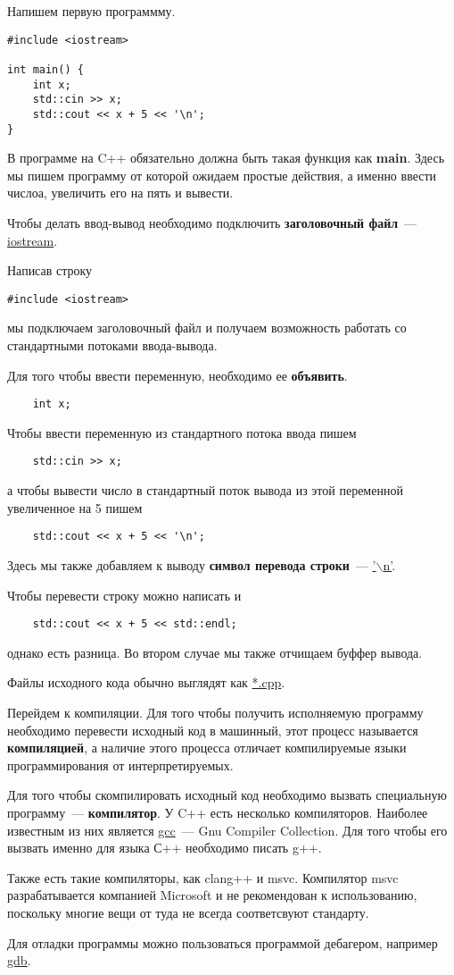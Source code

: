 \documentclass{article}
\begin{document}
Напишем первую программму.

\begin{verbatim}
#include <iostream>

int main() {
    int x;
    std::cin >> x;
    std::cout << x + 5 << '\n';
}
\end{verbatim}


В программе на C++ обязательно должна быть такая функция как \textbf{main}.
Здесь мы пишем программу от которой ожидаем простые действия, а именно ввести числоа, увеличить его на пять и вывести.

Чтобы делать ввод-вывод необходимо подключить \textbf{заголовочный файл}~--- \underline{iostream}.

Написав строку 
\begin{verbatim}
#include <iostream>
\end{verbatim}
мы подключаем заголовочный файл и получаем возможность работать со стандартными потоками ввода-вывода.

Для того чтобы ввести переменную, необходимо ее \textbf{объявить}. 
\begin{verbatim}
    int x;
\end{verbatim}

Чтобы ввести переменную из стандартного потока ввода пишем
\begin{verbatim}
    std::cin >> x;
\end{verbatim}

а чтобы вывести число в стандартный поток вывода из этой переменной увеличенное на 5 пишем
\begin{verbatim}
    std::cout << x + 5 << '\n';
\end{verbatim}

Здесь мы также добавляем к выводу \textbf{символ перевода строки}~--- \underline{'$\backslash$n'}.

Чтобы перевести строку можно написать и 
\begin{verbatim}
    std::cout << x + 5 << std::endl;
\end{verbatim}

однако есть разница. Во втором случае мы также отчищаем буффер вывода.

Файлы исходного кода обычно выглядят как \underline{*.cpp}.

Перейдем к компиляции. Для того чтобы получить исполняемую программу необходимо 
перевести исходный код в машинный, этот процесс называется \textbf{компиляцией}, а
наличие этого процесса отличает компилируемые языки программирования от интерпретируемых.

Для того чтобы скомпилировать исходный код необходимо вызвать специальную программу~--- \textbf{компилятор}.
У C++ есть несколько компиляторов. Наиболее известным из них является \underline{gcc}~--- Gnu Compiler Collection.
Для того чтобы его вызвать именно для языка С++ необходимо писать g++.

Также есть такие компиляторы, как clang++ и msvc.
Компилятор msvc разрабатывается компанией Microsoft и не рекомендован к использованию,
поскольку многие вещи от туда не всегда соответсвуют стандарту.

Для отладки программы можно пользоваться программой дебагером, например \underline{gdb}.
\end{document}
